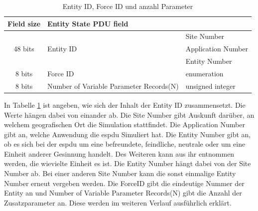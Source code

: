 \begin{table}[H]
	\begin{tabular}{|c|l|l|}
		\hline
		Field size             & \multicolumn{2}{l|}{Entity State PDU field}                  \\ \hline
		\multirow{3}{*}{48 bits}    & \multirow{3}{*}{Entity ID}              & Site Number        \\ \cline{3-3} 
		&                                         & Application Number \\ \cline{3-3} 
		&                                         & Entity Number      \\ \hline
		8 bits                      & Force ID                                & enumeration        \\ \hline
		8 bits                     & Number of Variable Parameter Records(N) & unsigned integer   \\ \hline
	
	\end{tabular}
\caption[Entity ID, Force ID und anzahl Parameter]{Entity ID, Force ID und anzahl Parameter\cite{SISOStandardsActivityCommitteeoftheIEEEComputerSociety.}}
\label{ids}
\end{table}
In Tabelle \ref{ids} ist angeben, wie sich der Inhalt der Entity ID zusammensetzt.
Die Werte hängen dabei von einander ab. Die  \glqq Site Number\grqq{} gibt Auskunft darüber, an welchem geografischen Ort die Simulation stattfindet.
Die \glqq Application Number\grqq{} gibt an, welche Anwendung die \ac{espdu} Simuliert hat. Die \glqq Entity Number\grqq{} gibt an, ob es sich bei der \ac{espdu} um eine befreundete, feindliche, neutrale oder um eine Einheit anderer Gesinnung handelt. Des Weiteren kann aus ihr entnommen werden, die wievielte Einheit es ist. Die \glqq Entity Number\grqq{} hängt dabei von der \glqq Site Number\grqq{} ab. Bei einer anderen \glqq Site Number\grqq{} kann die sonst einmalige \glqq Entity Number\grqq{} erneut vergeben werden. Die \glqq ForceID\grqq{} gibt die eindeutige Nummer der Entity an und \glqq Number of Variable Parameter Records(N)\grqq{} gibt die Anzahl der Zusatzparameter an. Diese werden im weiteren Verlauf ausführlich erklärt. 


